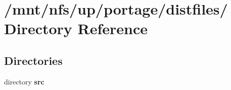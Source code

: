 \section{/mnt/nfs/up/portage/distfiles/ Directory Reference}
\label{dir_e27d00270f60808da6d6cb3650a04ccf}
\subsection*{Directories}
\begin{CompactItemize}
\item 
directory \bf{src}
\end{CompactItemize}
